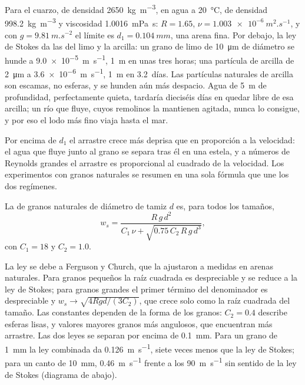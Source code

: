 Para el cuarzo, de densidad \qty{2650}{kg.m^{-3}}, en agua a \qty{20}{\celsius}, de densidad \qty{998.2}{kg.m^{-3}} y viscosidad \qty{1.0016}{mPa.s}:
$R =
1.65$, $\nu = \qty{1.003e-6}{m^2.s^{-1}}$, y con $g =
\qty{9.81}{m.s^{-2}}$ el límite es $d_1 = \qty{0.104}{mm}$, una arena fina. Por debajo, la ley de Stokes da las  del limo y la arcilla: un grano de limo
de \qty{10}{\micro m} de diámetro se hunde a \qty{9.0e-5}{m.s^{-1}}, \qty{1}{m} en unas tres horas; una partícula de arcilla de \qty{2}{\micro m} a
\qty{3.6e-6}{m.s^{-1}}, \qty{1}{m} en \num{3.2}~días. Las partículas naturales de arcilla son escamas, no esferas, y se hunden aún más despacio. Agua de
\qty{5}{m} de profundidad, perfectamente quieta, tardaría dieciséis días en quedar libre de esa arcilla; un río que fluye, cuyos remolinos la mantienen
agitada, nunca lo consigue, y por eso el lodo más fino viaja hasta el mar.

Por encima de $d_1$ el arrastre crece más deprisa que en proporción a la velocidad: el agua que fluye junto al grano se separa tras él en una estela, y a
números de Reynolds grandes el arrastre es proporcional al cuadrado de la velocidad. Los experimentos con granos naturales se resumen en una sola fórmula que
une los dos regímenes.

\begin{proposition}\label{prop:b1:erosion-transport:combined}
La  de granos naturales de diámetro de tamiz $d$ es, para todos los tamaños,
\[
  w_s = \frac{R\,g\,d^2}{C_1\,\nu + \sqrt{0.75\,C_2\,R\,g\,d^3}},
\]
con $C_1 = 18$ y $C_2 = 1.0$.
\end{proposition}
\admitted

La ley se debe a Ferguson y Church, que la ajustaron a  medidas en arenas naturales. Para granos pequeños la raíz cuadrada es
despreciable y se reduce a la ley de Stokes; para granos grandes el primer término del denominador es despreciable y $w_s \to \sqrt{4 R g d/(3 C_2)}$, que
crece solo como la raíz cuadrada del tamaño. Las constantes dependen de la forma de los granos: $C_2 = 0.4$ describe esferas lisas, y valores mayores granos
más angulosos, que encuentran más arrastre. Las dos leyes se separan por encima de \qty{0.1}{mm}. Para un grano de \qty{1}{mm} la ley combinada da
\qty{0.126}{m.s^{-1}}, siete veces menos que la ley de Stokes; para un canto de \qty{10}{mm}, \qty{0.46}{m.s^{-1}} frente a los \qty{90}{m.s^{-1}} sin sentido
de la ley de Stokes (diagrama de abajo).

